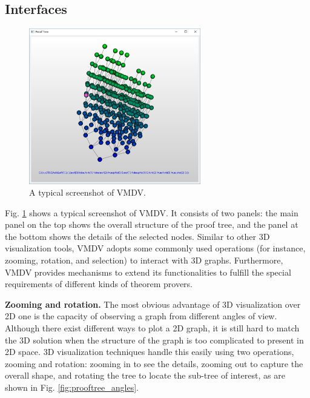 \documentclass[runningheads]{llncs}
\newcommand\tool[1]{\textsf{#1}}
\newcommand\vmdv{\tool{VMDV}}
\begin{document}
 
\subsection{Interfaces}
\begin{figure}[t]
	\centering
	\includegraphics[width=7.5cm]{./050407.png}
	\caption{A typical screenshot of \textsf{VMDV}.}
	\label{fig:screenshot}
\end{figure}
Fig. \ref{fig:screenshot} shows a typical screenshot of \textsf{VMDV}. It consists of two panels: the main panel on the top shows the overall structure of the proof tree, and the panel at the bottom shows the details of the selected nodes.
Similar to other 3D visualization tools, \vmdv{} adopts some commonly used operations (for instance, zooming, rotation, and selection) to interact with 3D graphs. Furthermore, \vmdv{} provides mechanisms to extend its functionalities to fulfill the special requirements of different kinds of theorem provers.


\hspace{-0.5cm}
{\bf Zooming and rotation.}
The most obvious advantage of 3D visualization over 2D one is the capacity of observing a graph from different angles of view. Although there exist different ways to plot a 2D graph, it is still hard to match the 3D solution when the structure of the graph is too complicated to present in 2D space. 3D visualization techniques handle this easily using two operations, zooming and rotation: zooming in to see the details, zooming out to capture the overall shape, and rotating the tree to locate the sub-tree of interest, as are shown in Fig. \ref{fig:prooftree_angles}.
 
\end{document}
